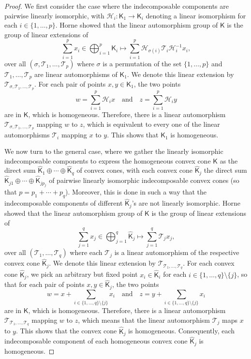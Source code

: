 \documentclass[oneside]{amsart}
\theoremstyle{plain}
\theoremstyle{definition}
\theoremstyle{remark}
\numberwithin{equation}{section}
\begin{document}
\begin{proof}
We first consider the case where the indecomposable components are pairwise
linearly isomorphic, with $\mathcal{H}_{i} : \mathsf{K}_{1} \to
\mathsf{K}_{i}$ denoting a linear isomorphism for each $i \in \{1, \dotsc,
p\}$. Horne \cite[Lemma~4.1]{Hor78} showed that the linear automorphism
group of $\mathsf{K}$ is the group of linear extensions of
\[
\sum_{i=1}^{p} x_{i} \in \bigoplus_{i=1}^{p} \mathsf{K}_{i} \mapsto
\sum_{i=1}^{p} \mathcal{H}_{\sigma(i)} \mathcal{T}_{i} \mathcal{H}_{i}^{-1}
x_{i},
\]
over all $(\sigma, \mathcal{T}_{1}, \dotsc, \mathcal{T}_{p})$ where
$\sigma$ is a permutation of the set $\{1, \dotsc, p\}$ and
$\mathcal{T}_{1}, \dotsc, \mathcal{T}_{p}$ are linear automorphisms of
$\mathsf{K}_{1}$. We denote this linear extension by $\mathcal{T}_{\sigma,
\mathcal{T}_{1}, \dotsc, \mathcal{T}_{p}}$. For each pair of points $x, y
\in \mathsf{K}_{1}$, the two points
\[
w = \sum_{i=1}^{p} \mathcal{H}_{i} x \quad \text{and} \quad z =
\sum_{i=1}^{p} \mathcal{H}_{i} y
\]
are in $\mathsf{K}$, which is homogeneous. Therefore, there is a linear
automorphism $\mathcal{T}_{\sigma, \mathcal{T}_{1}, \dotsc,
\mathcal{T}_{p}}$ mapping $w$ to $z$, which is equivalent to every one of
the linear automorphisms $\mathcal{T}_{i}$ mapping $x$ to $y$. This shows
that $\mathsf{K}_{1}$ is homogeneous.

We now turn to the general case, where we gather the linearly isomorphic
indecomposable components to express the homogeneous convex cone
$\mathsf{K}$ as the direct sum $\hat{\mathsf{K}}_{1} \oplus \dotsb \oplus
\hat{\mathsf{K}}_{q}$ of convex cones, with each convex cone
$\hat{\mathsf{K}}_{j}$ the direct sum $\hat{\mathsf{K}}_{j1} \oplus \dotsb
\oplus \hat{\mathsf{K}}_{jp_j}$ of pairwise linearly isomorphic
indecomposable convex cones (so that $p = p_1 + \dotsb + p_q$). Moreover,
this is done in such a way that the indecomposable components of different
$\hat{\mathsf{K}}_{j}$'s are not linearly isomorphic. Horne
\cite[Theorem~4.2]{Hor78} showed that the linear automorphism group of
$\mathsf{K}$ is the group of linear extensions of
\[
\sum_{j=1}^{q} x_{j} \in \bigoplus_{j=1}^{q} \hat{\mathsf{K}}_{j} \mapsto
\sum_{j=1}^{q} \mathcal{T}_{j} x_{j},
\]
over all $(\mathcal{T}_{1}, \dotsc, \mathcal{T}_{q})$ where each
$\mathcal{T}_{j}$ is a linear automorphism of the respective convex cone
$\hat{\mathsf{K}}_{j}$. We denote this linear extension by
$\mathcal{T}_{\mathcal{T}_{1}, \dotsc, \mathcal{T}_{q}}$. For each convex
cone $\hat{\mathsf{K}}_{j}$, we pick an arbitrary but fixed point $x_{i}
\in \hat{\mathsf{K}}_{i}$ for each $i \in \{1, \dotsc, q\} \setminus
\{j\}$, so that for each pair of points $x, y \in \hat{\mathsf{K}}_{j}$,
the two points
\[
w = x + \sum_{i \in \{1, \dotsc, q\} \setminus \{j\}} x_{i} \quad
\text{and} \quad z = y + \sum_{i \in \{1, \dotsc, q\} \setminus \{j\}}
x_{i}
\]
are in $\mathsf{K}$, which is homogeneous. Therefore, there is a linear
automorphism $\mathcal{T}_{\mathcal{T}_{1}, \dotsc, \mathcal{T}_{q}}$
mapping $w$ to $z$, which means that the linear automorphism
$\mathcal{T}_{j}$ maps $x$ to $y$. This shows that the convex cone
$\hat{\mathsf{K}}_{j}$ is homogeneous. Consequently, each indecomposable
component of each homogeneous convex cone $\hat{\mathsf{K}}_{j}$ is
homogeneous.
\end{proof}
\end{document}

